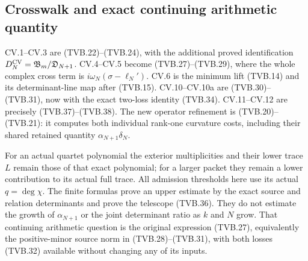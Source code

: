 \subsection[\hspace{0.4em}Crosswalk and exact continuing arithmetic quantity]{Crosswalk and exact continuing arithmetic quantity}

CV.1--CV.3 are (TVB.22)--(TVB.24), with the additional proved
identification $D_N^{\rm CV}=\mathfrak B_m/\mathfrak D_{N+1}$.
CV.4--CV.5 become (TVB.27)--(TVB.29), where the whole complex
cross term is $i\omega_N(\sigma-\ell_N')$.
CV.6 is the minimum lift (TVB.14) and its determinant-line map
after (TVB.15). CV.10--CV.10a are (TVB.30)--(TVB.31), now with
the exact two-loss identity (TVB.34). CV.11--CV.12 are precisely
(TVB.37)--(TVB.38). The new operator refinement is (TVB.20)--(TVB.21):
it computes both individual rank-one curvature costs, including
their shared retained quantity $\alpha_{N+1}\delta_N$.

For an actual quartet polynomial the exterior multiplicities and
their lower trace $L$ remain those of that exact polynomial; for a
larger packet they remain a lower contribution to its actual full
trace. All admission thresholds here use its actual $q=\deg\chi$.
The finite formulas prove an upper estimate by the exact source and
relation determinants and prove the telescope (TVB.36). They do not
estimate the growth of $\alpha_{N+1}$ or the joint determinant
ratio as $k$ and $N$ grow. That continuing arithmetic question is
the original expression (TVB.27), equivalently the positive-minor
source norm in (TVB.28)--(TVB.31), with both losses (TVB.32)
available without changing any of its inputs.

\endgroup
